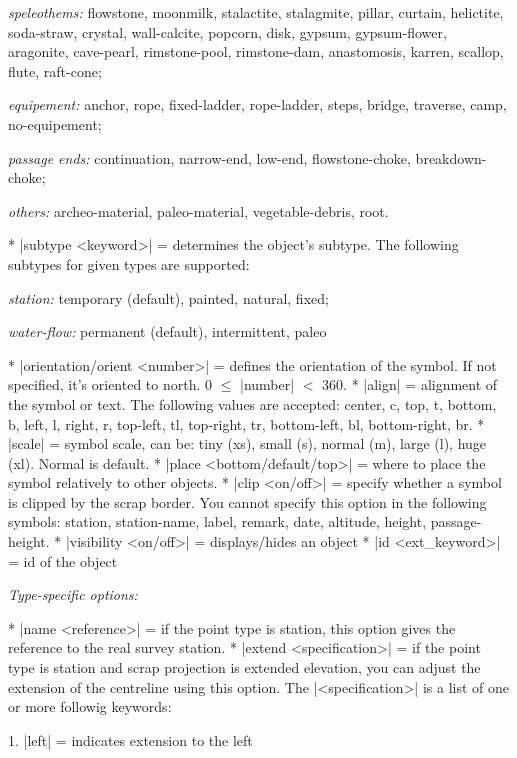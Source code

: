     {\it speleothems:} flowstone, moonmilk, stalactite, stalagmite,
    pillar, curtain, helictite, soda-straw, crystal, wall-calcite,
    popcorn, disk, gypsum, gypsum-flower, aragonite, cave-pearl,
    rimstone-pool, rimstone-dam, anastomosis, karren, scallop,
    flute, raft-cone;

    {\it equipement:} anchor, rope, fixed-ladder, rope-ladder, steps,
    bridge, traverse, camp, no-equipement;

    {\it passage ends:} continuation, narrow-end, low-end, flowstone-choke,
    breakdown-choke;

    {\it others:} archeo-material, paleo-material, vegetable-debris, root.
\endarguments


\options
  * |subtype <keyword>| = determines the object's subtype. The following
    subtypes for given types are supported: 
    
    {\it station:} temporary (default), painted, natural, fixed;

    {\it water-flow:} permanent (default), intermittent, paleo

  * |orientation/orient <number>| = defines the orientation
    of the symbol. If not specified, it's oriented to north.
    0 $\le$ |number| $<$ 360.
  * |align| = alignment of the symbol or text. The following values
    are accepted: center, c, top, t, bottom, b, left, l, right, r,
    top-left, tl, top-right, tr, bottom-left, bl, bottom-right, br.
  * |scale| = symbol scale, can be: 
    tiny (xs), small (s), normal (m), large (l), huge (xl). Normal is default.
  * |place <bottom/default/top>| = where to place the symbol relatively
    to other objects.
  * |clip <on/off>| = specify whether a symbol is clipped by the scrap border.
    You cannot specify this option in the following symbols: station,
    station-name, label, remark, date, altitude, height, passage-height.
  * |visibility <on/off>| = displays/hides an object
  * |id <ext_keyword>| = id of the object

    {\it Type-specific options:}\Nobreak

  * |name <reference>| = if the point type is station, this
    option gives the reference to the real survey station.
  * |extend <specification>| = if the point type is station and scrap
    projection is extended elevation, you can
    adjust the extension of the centreline using this option. The |<specification>| is a list
    of one or more followig keywords:

    1. |left| = indicates extension to the left

